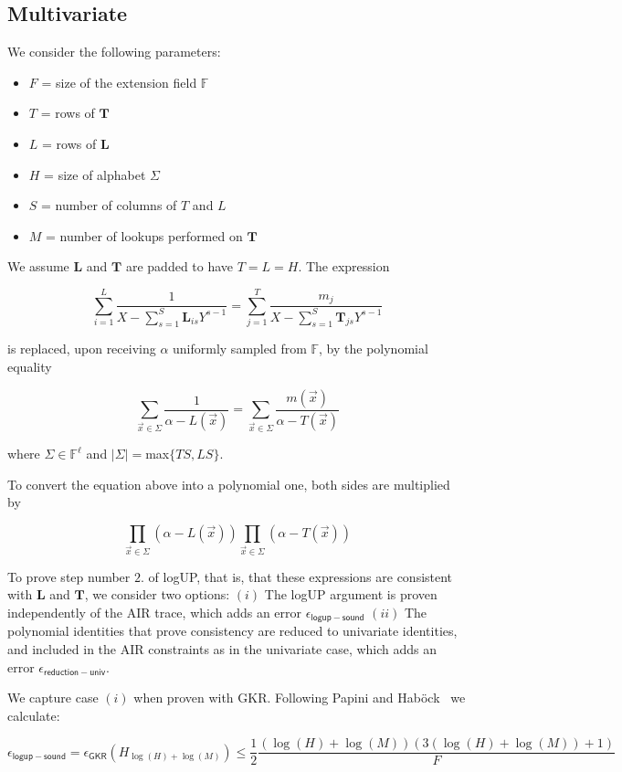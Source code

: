 \subsection{Multivariate}

We consider the following parameters:
\begin{itemize}
	\item $F$ = size of the extension field $\mathbb{F}$
	\item $T$ = rows of $\mathbf{T}$
	\item $L$ = rows of $\mathbf{L}$
	\item $H$ = size of alphabet $\Sigma$
	\item $S$ = number of columns of $T$ and $L$
	\item $M$ = number of lookups performed on $\mathbf{T}$
\end{itemize}

We assume $\mathbf L$ and $\mathbf T$ are padded to have $T=L=H$.
The expression 

$$\sum_{i=1}^L \frac{1}{X- \sum_{s=1}^S \mathbf L_{is}Y^{s-1}}=\sum_{j=1}^T \frac{m_j}{X-\sum_{s=1}^S \mathbf T_{js}Y^{s-1}}$$

is replaced, upon receiving $\alpha$ uniformly sampled from $\mathbb{F}$, by the polynomial equality  

$$\sum_{\vec x\in \Sigma} \frac{1}{\alpha- L(\vec x)}=\sum_{\vec x\in \Sigma} \frac{m(\vec x)}{\alpha-T(\vec x)}$$

where $\Sigma\in\mathbb{F}^\ell$ and $|\Sigma|=$max$\{TS, LS\}$.

To convert the equation above into a polynomial one, both sides are multiplied by 

$$\prod_{\vec x\in \Sigma}(\alpha - L(\vec x))\prod_{\vec x\in \Sigma}(\alpha - T(\vec x))$$

To prove step number $2.$ of logUP, that is, that these expressions are consistent with $\mathbf L$ and $\mathbf T$, we consider two options: 
$(i)$ The logUP argument is proven independently of the AIR trace, which adds an error $\epsilon_{\mathsf{logup-sound}}$
$(ii)$ The polynomial identities that prove consistency are reduced to univariate identities, and included in the AIR constraints as in the univariate case, which adds an error $\epsilon_{\mathsf{reduction-univ}}$.

We capture case $(i)$ when proven with GKR. Following Papini and Haböck~\cite{logup-GKR} we calculate:

$$\epsilon_{\mathsf{logup-sound}}=\epsilon_{\mathsf{GKR}}(H_{\log(H)+\log(M)})\leq \frac{1}{2}\frac{(\log(H)+\log(M))(3(\log(H)+\log(M))+1)}{F}$$

